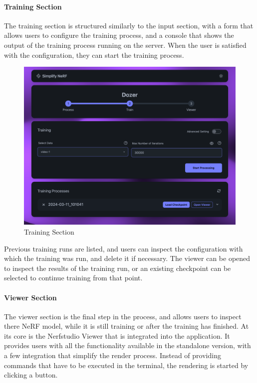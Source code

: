 \paragraph{Training Section}

The training section is structured similarly to the input section, with a form that allows users to configure the training process, and a console that shows the output of the training process running on the server.
When the user is satisfied with the configuration, they can start the training process.

\begin{figure}[htb]
  \includegraphics[width=\textwidth]{figures/view-train.png}
  \caption{Training Section}
  \label{fig:design:training-section}
\end{figure}


Previous training runs are listed, and users can inspect the configuration with which the training was run, and delete it if necessary. 
The viewer can be opened to inspect the results of the training run, or an existing checkpoint can be selected to continue training from that point.

\paragraph{Viewer Section}

The viewer section is the final step in the process, and allows users to inspect there NeRF model, while it is still training or after the training has finished.
At its core is the Nerfstudio Viewer that is integrated into the application. 
It provides users with all the functionality available in the standalone version, with a few integration that simplify the render process.
Instead of providing commands that have to be executed in the terminal, the rendering is started by clicking a button.


